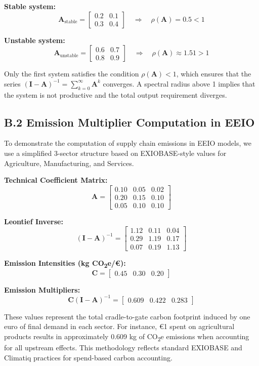 \documentclass[12pt,a4paper]{article}%
\begin{document}
\textbf{Stable system:}
\[
\mathbf{A}_{\text{stable}} =
\begin{bmatrix}
0.2 & 0.1 \\
0.3 & 0.4
\end{bmatrix}
\quad \Rightarrow \quad \rho(\mathbf{A}) = 0.5 < 1
\]

\textbf{Unstable system:}
\[
\mathbf{A}_{\text{unstable}} =
\begin{bmatrix}
0.6 & 0.7 \\
0.8 & 0.9
\end{bmatrix}
\quad \Rightarrow \quad \rho(\mathbf{A}) \approx 1.51 > 1
\]

Only the first system satisfies the condition \( \rho(\mathbf{A}) < 1 \), which ensures that the series \( (\mathbf{I} - \mathbf{A})^{-1} = \sum_{k=0}^\infty \mathbf{A}^k \) converges. A spectral radius above 1 implies that the system is not productive and the total output requirement diverges.

\subsection*{B.2 Emission Multiplier Computation in EEIO}

To demonstrate the computation of supply chain emissions in EEIO models, we use a simplified 3-sector structure based on EXIOBASE-style values for Agriculture, Manufacturing, and Services.

\textbf{Technical Coefficient Matrix:}
\[
\mathbf{A} =
\begin{bmatrix}
0.10 & 0.05 & 0.02 \\
0.20 & 0.15 & 0.10 \\
0.05 & 0.10 & 0.10
\end{bmatrix}
\]

\textbf{Leontief Inverse:}
\[
(\mathbf{I} - \mathbf{A})^{-1} =
\begin{bmatrix}
1.12 & 0.11 & 0.04 \\
0.29 & 1.19 & 0.17 \\
0.07 & 0.19 & 1.13
\end{bmatrix}
\]

\textbf{Emission Intensities (kg CO\textsubscript{2}e/€):}
\[
\mathbf{C} = \begin{bmatrix} 0.45 & 0.30 & 0.20 \end{bmatrix}
\]

\textbf{Emission Multipliers:}
\[
\mathbf{C} (\mathbf{I} - \mathbf{A})^{-1} =
\begin{bmatrix}
0.609 & 0.422 & 0.283
\end{bmatrix}
\]

These values represent the total cradle-to-gate carbon footprint induced by one euro of final demand in each sector. For instance, €1 spent on agricultural products results in approximately 0.609 kg of CO\textsubscript{2}e emissions when accounting for all upstream effects. This methodology reflects standard EXIOBASE and Climatiq practices for spend-based carbon accounting.
\end{document}
